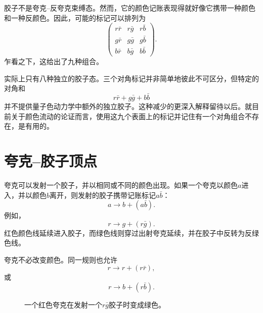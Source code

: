 胶子不是夸克--反夸克束缚态。然而，它的颜色记账表现得就好像它携带一种颜色和一种反颜色。因此，可能的标记可以排列为
\begin{equation}
\begin{pmatrix}
r\bar r&r\bar g&r\bar b\\
g\bar r&g\bar g&g\bar b\\
b\bar r&b\bar g&b\bar b
\end{pmatrix}.
\end{equation}
乍看之下，这给出了九种组合。

\begin{classroomqa}
\end{classroomqa}

实际上只有八种独立的胶子态。三个对角标记并非简单地彼此不可区分，但特定的对角和
\begin{equation}
r\bar r+g\bar g+b\bar b
\end{equation}
并不提供量子色动力学中额外的独立胶子。这种减少的更深入解释留待以后。就目前关于颜色流动的论证而言，使用这九个表面上的标记并记住有一个对角组合不存在，是有用的。

\section{夸克--胶子顶点}

夸克可以发射一个胶子，并以相同或不同的颜色出现。如果一个夸克以颜色\(a\)进入，并以颜色\(b\)离开，则发射的胶子携带记账标记\(a\bar b\)：
\begin{equation}
a\longrightarrow b+(a\bar b).
\end{equation}
例如，
\begin{equation}
r\longrightarrow g+(r\bar g).
\end{equation}
红色颜色线延续进入胶子，而绿色线则穿过出射夸克延续，并在胶子中反转为反绿色线。

夸克不必改变颜色。同一规则也允许
\begin{equation}
r\longrightarrow r+(r\bar r),
\end{equation}
或
\begin{equation}
r\longrightarrow b+(r\bar b).
\end{equation}

\begin{figure}[h]
\centering
{}
\caption{一个红色夸克在发射一个\(r\bar g\)胶子时变成绿色。}
\end{figure}

